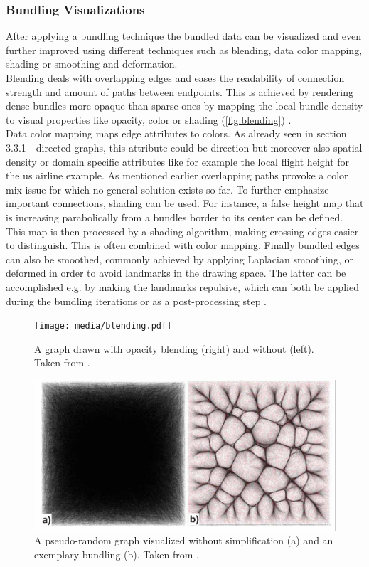 \subsubsection{Bundling Visualizations}
After applying a bundling technique the bundled data can be visualized and even further improved using different techniques such as blending, data color mapping, shading or smoothing and deformation.\\
Blending deals with overlapping edges and eases the readability of connection strength and amount of paths between endpoints. This is achieved by rendering dense bundles more opaque than sparse ones by mapping the local bundle density to visual properties like opacity, color or shading (\autoref{fig:blending}) \cite{Lhuillier2017}.\\
Data color mapping maps edge attributes to colors. As already seen in section 3.3.1 - directed graphs, this attribute could be direction but moreover also spatial density or domain specific attributes like for example the local flight height for the us airline example. As mentioned earlier overlapping paths provoke a color mix issue for which no general solution exists so far.
To further emphasize important connections, shading can be used. For instance, a false height map that is increasing parabolically from a bundles border to its center can be defined. This map is then processed by a shading algorithm, making crossing edges easier to distinguish. This is often combined with color mapping.
Finally bundled edges can also be smoothed, commonly achieved by applying Laplacian smoothing, or deformed in order to avoid landmarks in the drawing space. The latter can be accomplished e.g. by making the landmarks repulsive, which can both be applied during the bundling iterations or as a post-processing step \cite{Lhuillier2017}.

\begin{figure}
    \centering
    \texttt{[image: media/blending.pdf]}
    \caption{A graph drawn with opacity blending (right) and without (left). Taken from \cite{Lhuillier2017}.}
    \label{fig:blending}
\end{figure}
\begin{figure}
    \centering
    \includegraphics[scale=0.65]{media/faithfullness_bundling.pdf}
    \caption{A pseudo-random graph visualized without simplification (a) and an exemplary bundling (b). Taken from \cite{Lhuillier2017}.}
    \label{fig:faithfulness}
\end{figure}
